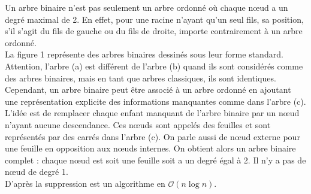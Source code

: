 \documentclass{report}
\begin{document}
Un arbre binaire n'est pas seulement un arbre ordonné où chaque nœud a un degré maximal de 2.  En effet, pour une racine n'ayant qu'un seul fils, sa position, s'il s'agit du fils de gauche ou du fils de droite, importe contrairement à un arbre ordonné.\\
La figure 1 représente des arbres binaires dessinés sous leur forme standard. Attention, l'arbre (a) est différent de l'arbre (b) quand ils sont considérés comme des arbres binaires, mais en tant que arbres classiques, ils sont identiques.\\
Cependant, un arbre binaire peut être associé à un arbre ordonné en ajoutant une représentation explicite des informations manquantes comme dans l'arbre (c). L'idée est de remplacer chaque enfant manquant de l'arbre binaire par un nœud n'ayant aucune descendance. Ces nœuds sont appelés des feuilles et sont représentés par des carrés dans l'arbre (c). On parle aussi de nœud externe pour une feuille en opposition aux nœuds internes. On obtient alors un arbre binaire complet : chaque nœud est soit une feuille soit a un degré égal à 2. Il n'y a pas de nœud de degré 1.\\
D'après \cite{Cormen:2009:IAT:1614191} la suppression est un algorithme en $\mathcal{O}(n \log{n})$.


\listoffigures
\end{document}
